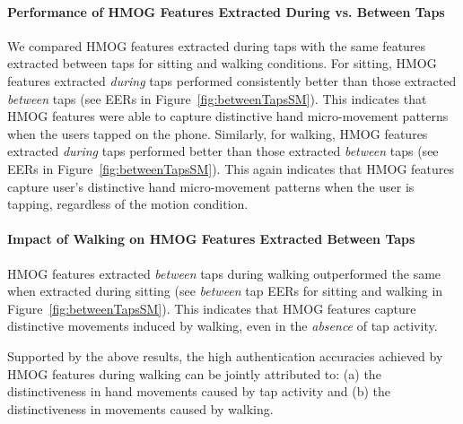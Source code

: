 %
%
%

%

\paragraph{Performance of HMOG Features Extracted During vs. Between Taps}  
We compared HMOG features extracted during taps with the same features extracted between taps for sitting and walking conditions. For sitting, HMOG features extracted {\em during} taps performed consistently better  than those extracted {\em between} taps (see EERs in Figure~\ref{fig:betweenTapsSM}). This indicates that HMOG features were able to capture distinctive hand micro-movement patterns when the users tapped on the phone. %
%
%
Similarly, for walking, HMOG features extracted {\em during} taps performed better than those extracted {\em between} taps (see EERs in Figure~\ref{fig:betweenTapsSM}). This again indicates that HMOG features capture user's distinctive hand micro-movement patterns when the user is tapping, regardless of the motion condition.
%


%
%

\paragraph{Impact of Walking on HMOG Features Extracted Between Taps} HMOG features extracted  {\em between} taps during walking outperformed the same when extracted during sitting (see {\em between} tap EERs for sitting and walking in Figure~\ref{fig:betweenTapsSM}). This indicates that HMOG features capture distinctive movements induced by walking, even in the {\em absence} of tap activity.%
%
%


\bigskip
Supported by the above results, the high authentication accuracies achieved by HMOG features during walking can be jointly attributed to: (a) the distinctiveness in hand movements caused by tap activity and (b) the distinctiveness in movements caused by walking. %


%

%
%

%

%
%
%

%

%
%

%

%


%

%


%
  
%


